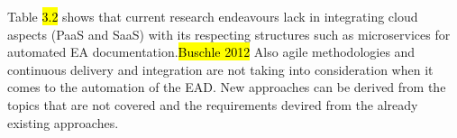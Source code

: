 Table \hl{3.2} shows that current research endeavours lack in integrating cloud aspects (PaaS and SaaS) with its respecting structures such as microservices for automated EA documentation.\hl{Buschle 2012} Also agile methodologies and continuous delivery and integration are not taking into consideration when it comes to the automation of the EAD. New approaches can be derived from the topics that are not covered and the requirements devired from the already existing approaches.


